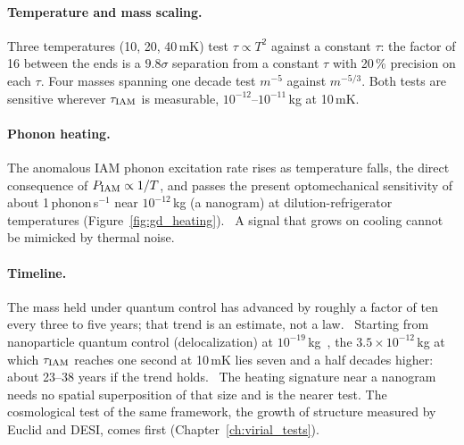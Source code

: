 \paragraph{Temperature and mass scaling.} Three temperatures (10, 20, 40\,mK) test $\tau\propto T^2$ against a constant $\tau$: the factor of 16 between the
ends is a $9.8\sigma$ separation from a constant $\tau$ with 20\,\% precision on each $\tau$. Four masses spanning one decade test $m^{-5}$ against $m^{-5/3}$. Both tests are
sensitive wherever $\tau_{\rm IAM}$ is measurable, $10^{-12}$--$10^{-11}$\,kg at 10\,mK. \calc

\paragraph{Phonon heating.} The anomalous IAM phonon excitation rate rises as temperature falls, the direct consequence of $P_{\rm IAM}\propto1/T$, and passes
the present optomechanical sensitivity of about 1\,phonon\,s$^{-1}$ near $10^{-12}$\,kg (a nanogram) at dilution-refrigerator temperatures
(Figure~\ref{fig:gd_heating}). \prediction\ A signal that grows on cooling cannot be mimicked by thermal noise.

\paragraph{Timeline.} The mass held under quantum control has advanced by roughly a factor of ten every three to five years; that trend is an estimate,
not a law. \calc\ Starting from nanoparticle quantum control (delocalization) at $10^{-19}$\,kg~\cite{Rossi2025,Neumeier2024}, the $3.5\times10^{-12}$\,kg
at which $\tau_{\rm IAM}$ reaches one second at 10\,mK lies seven and a half decades higher: about 23--38 years if the trend holds. \calc\ The heating signature near a nanogram needs no spatial superposition of that size and is
the nearer test. The cosmological test of the same framework, the growth of structure measured by Euclid and DESI, comes first
(Chapter~\ref{ch:virial_tests}).

